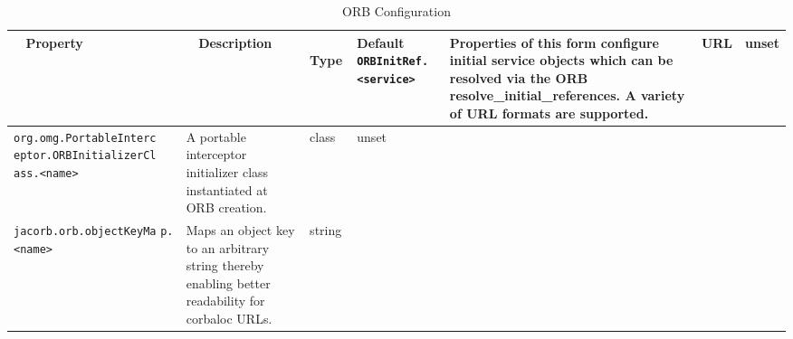 {{\begin{small}
\begin{longtable}{|p{5cm}|p{7.5cm}|p{1.5cm}|p{1.5cm}|}
\caption{ORB Configuration}\\
\hline
~ \hfill \textbf {Property} \hfill ~ & ~ \hfill \textbf {Description}
\hfill ~ & ~ \hfill \textbf {Type} \hfill ~ & \hfill \textbf{Default} \endhead
\hline
\verb"ORBInitRef.<service>" & Properties of this form configure
initial service objects which can be resolved via the ORB
resolve\_initial\_references. A variety of URL formats are
supported. & URL & unset \\
\hline
\verb"org.omg.PortableInterc"
\verb"eptor.ORBInitializerCl"
\verb"ass.<name>" & A portable interceptor initializer class
instantiated at ORB creation. & class & unset \\
\hline
\verb"jacorb.orb.objectKeyMa"
\verb"p.<name>" & Maps an object key to an arbitrary string thereby
enabling better readability for corbaloc URLs. & string & \\
\hline


\end{longtable}
\end{small}}}

